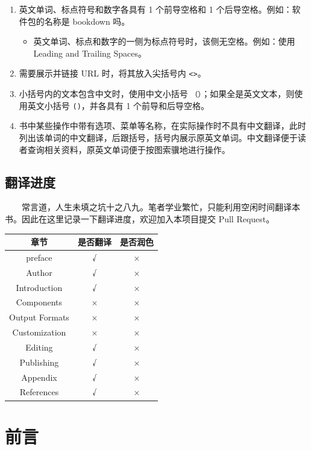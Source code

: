 \documentclass[
  12pt,
]{krantz}
\providecommand{\tightlist}{%
  \setlength{\itemsep}{0pt}\setlength{\parskip}{0pt}}
\theoremstyle{definition}
\theoremstyle{definition}
\theoremstyle{definition}
\theoremstyle{definition}
\theoremstyle{remark}
\begin{document}
\begin{enumerate}
\def\labelenumi{\arabic{enumi}.}
\tightlist
\item
  英文单词、标点符号和数字各具有 1 个前导空格和 1 个后导空格。例如：软件包的名称是 bookdown 吗。

  \begin{itemize}
  \tightlist
  \item
    英文单词、标点和数字的一侧为标点符号时，该侧无空格。例如：使用 Leading and Trailing Spaces。
  \end{itemize}
\item
  需要展示并链接 URL 时，将其放入尖括号内 \texttt{\textless{}\textgreater{}}。
\item
  小括号内的文本包含中文时，使用中文小括号 \texttt{（）}；如果全是英文文本，则使用英文小括号 \texttt{()}，并各具有 1 个前导和后导空格。
\item
  书中某些操作中带有选项、菜单等名称，在实际操作时不具有中文翻译，此时列出该单词的中文翻译，后跟括号，括号内展示原英文单词。中文翻译便于读者查询相关资料，原英文单词便于按图索骥地进行操作。
\end{enumerate}

\hypertarget{ux7ffbux8bd1ux8fdbux5ea6}{%
\section*{翻译进度}\label{ux7ffbux8bd1ux8fdbux5ea6}}


  常言道，人生未填之坑十之八九。笔者学业繁忙，只能利用空闲时间翻译本书。因此在这里记录一下翻译进度，欢迎加入本项目提交 Pull Request。

\begin{longtable}[]{@{}ccc@{}}
\toprule
章节 & 是否翻译 & 是否润色 \\
\midrule
\endhead
preface & √ & × \\
Author & √ & × \\
Introduction & √ & × \\
Components & × & × \\
Output Formats & × & × \\
Customization & × & × \\
Editing & √ & × \\
Publishing & √ & × \\
Appendix & √ & × \\
References & √ & × \\
\bottomrule
\end{longtable}

\hypertarget{ux524dux8a00}{%
\chapter*{前言}\label{ux524dux8a00}}
\end{document}
